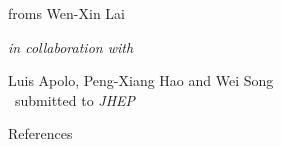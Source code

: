 \documentclass[aspectratio=169,10pt
	,noamsthm
]{beamer}
\begin{document}
\begin{frame}

\centering

\huge
{}
\bigskip

\large
froms Wen-Xin Lai\ 

\textit{\normalsize in collaboration with}

	Luis Apolo,
	Peng-Xiang Hao 
	and Wei Song \\[2ex]
\ submitted to \textit{JHEP}

\end{frame}




\begin{frame}[allowframebreaks]{References}
\renewcommand*{\bibfont}{\footnotesize}
\printbibliography %
\end{frame}
\end{document}
